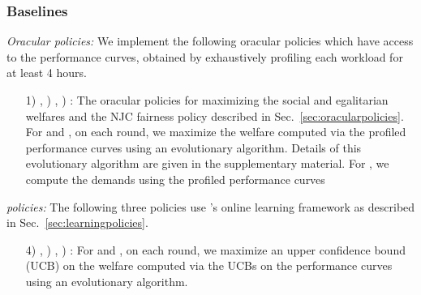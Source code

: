\subsubsection{Baselines}
\label{sec:baselinesfixedclus}
\vspace{-1mm}

\newcommand{\bstitle}[1]{\emph{#1:}}
\bstitle{Oracular policies}
We implement the following oracular policies which have access to the performance curves,
obtained by exhaustively profiling
each workload for at least 4 hours.
\vspace{-0.02in}
\begin{itemize}
\item[1)] \oraclesw, ) \oracleew, ) \oraclenjc:
The oracular policies for maximizing the social and egalitarian welfares
and the NJC fairness policy described in Sec.~\ref{sec:oracularpolicies}.
For \oraclesws and \oracleew, on each round,
we maximize the welfare computed via the profiled performance curves using an evolutionary
algorithm.
Details of this evolutionary algorithm are given in the supplementary material.
For \oraclenjc, we compute the demands using the profiled performance curves
\end{itemize}
\vspace{-0.05in}


\bstitle{\cilantros policies}
The following three policies use \cilantro's online learning framework as described in
Sec.~\ref{sec:learningpolicies}.
\vspace{-0.02in}
\begin{itemize}
\item[4)] \cilantrosw, ) \cilantroew, ) \cilantronjc:
For \cilantrosws and \cilantroew, on each round,
we maximize an upper confidence bound (UCB) on the welfare computed via the UCBs
on the performance curves using an evolutionary algorithm.
\end{itemize}
\vspace{-0.05in}

